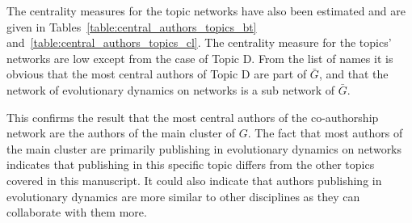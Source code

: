 \documentclass{article}
\theoremstyle{definition}
\begin{document}
The
centrality measures for the topic networks have also been estimated and are
given in Tables~\ref{table:central_authors_topics_bt}
and~\ref{table:central_authors_topics_cl}. The centrality measure for the
topics' networks are low except from the case of Topic D. From the
list of names it is obvious that the most central authors of Topic D are part of \(\bar{G}\), and that
the network of evolutionary dynamics on networks is a sub network of \(\bar{G}\).

This confirms the result that the most central authors of 
the co-authorship network are the authors of the main cluster of \(G\).
The fact that most authors of the main cluster are primarily publishing in
evolutionary dynamics on networks indicates that publishing in this specific
topic differs from the other topics covered in this manuscript. It could also
indicate that authors publishing in evolutionary dynamics are more similar to other
disciplines as they can collaborate with them more.
\end{document}
